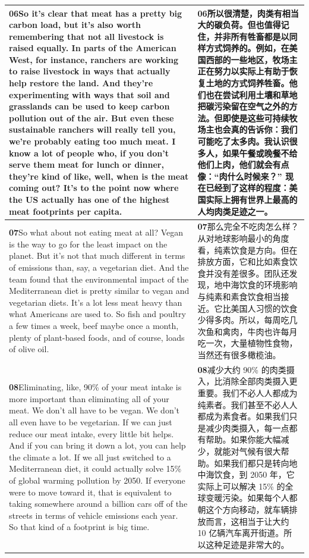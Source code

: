 \documentclass[UTF8,zihao=-4,fontset=fandol]{ctexart}
\newcommand{\TranscriptColumn}{\raggedright\arraybackslash\hyphenpenalty=10000\exhyphenpenalty=10000\sloppy}
\begin{document}
\begin{longtable}{>{\TranscriptColumn}p{} >{\TranscriptColumn}p{}}
\textbf{06}\quad So it's clear that meat has a pretty big carbon load, but it's also worth remembering that not all livestock is raised equally. In parts of the American West, for instance, ranchers are working to raise livestock in ways that actually help restore the land. And they're experimenting with ways that soil and grasslands can be used to keep carbon pollution out of the air. But even these sustainable ranchers will really tell you, we're probably eating too much meat. I know a lot of people who, if you don't serve them meat for lunch or dinner, they're kind of like, well, when is the meat coming out? It's to the point now where the US actually has one of the highest meat footprints per capita. & \textbf{06}\quad 所以很清楚，肉类有相当大的碳负荷。但也值得记住，并非所有牲畜都是以同样方式饲养的。例如，在美国西部的一些地区，牧场主正在努力以实际上有助于恢复土地的方式饲养牲畜。他们也在尝试利用土壤和草地把碳污染留在空气之外的方法。但即使是这些可持续牧场主也会真的告诉你：我们可能吃了太多肉。我认识很多人，如果午餐或晚餐不给他们上肉，他们就会有点像：“肉什么时候来？” 现在已经到了这样的程度：美国实际上拥有世界上最高的人均肉类足迹之一。 \\ \hline
\textbf{07}\quad So what about not eating meat at all? Vegan is the way to go for the least impact on the planet. But it's not that much different in terms of emissions than, say, a vegetarian diet. And the team found that the environmental impact of the Mediterranean diet is pretty similar to vegan and vegetarian diets. It's a lot less meat heavy than what Americans are used to. So fish and poultry a few times a week, beef maybe once a month, plenty of plant-based foods, and of course, loads of olive oil. & \textbf{07}\quad 那么完全不吃肉怎么样？从对地球影响最小的角度看，纯素饮食是方向。但在排放方面，它和比如素食饮食并没有差很多。团队还发现，地中海饮食的环境影响与纯素和素食饮食相当接近。它比美国人习惯的饮食少得多肉。所以，每周吃几次鱼和禽肉，牛肉也许每月吃一次，大量植物性食物，当然还有很多橄榄油。 \\ \hline
\textbf{08}\quad Eliminating, like, 90\% of your meat intake is more important than eliminating all of your meat. We don't all have to be vegan. We don't all even have to be vegetarian. If we can just reduce our meat intake, every little bit helps. And if you can bring it down a lot, you can help the climate a lot. If we all just switched to a Mediterranean diet, it could actually solve 15\% of global warming pollution by 2050. If everyone were to move toward it, that is equivalent to taking somewhere around a billion cars off of the streets in terms of vehicle emissions each year. So that kind of a footprint is big time. & \textbf{08}\quad 减少大约 90\% 的肉类摄入，比消除全部肉类摄入更重要。我们不必人人都成为纯素者。我们甚至不必人人都成为素食者。如果我们只是减少肉类摄入，每一点都有帮助。如果你能大幅减少，就能对气候有很大帮助。如果我们都只是转向地中海饮食，到 2050 年，它实际上可以解决 15\% 的全球变暖污染。如果每个人都朝这个方向移动，就车辆排放而言，这相当于让大约 10 亿辆汽车离开街道。所以这种足迹是非常大的。 \\ \hline

\end{longtable}
\end{document}
